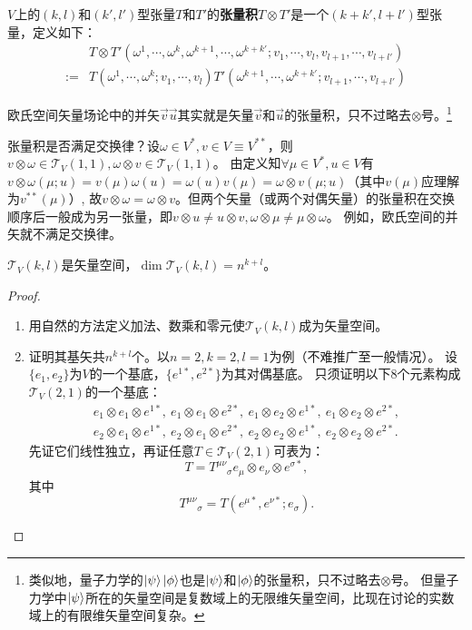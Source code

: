 \begin{definition}
$V$上的$(k, l)$和$(k', l')$型张量$T$和$T'$的\textbf{张量积}$T \otimes T'$是一个$(k + k', l + l')$型张量，定义如下：
$$\begin{aligned}
& T \otimes T'(\omega^1, \cdots, \omega^k, \omega^{k + 1}, \cdots, \omega^{k + k'}; v_1, \cdots, v_l, v_{l + 1}, \cdots, v_{l + l'}) \\
:= & T(\omega^1, \cdots, \omega^k; v_1, \cdots, v_l)T'(\omega^{k + 1}, \cdots, \omega^{k + k'}; v_{l + 1}, \cdots, v_{l + l'})
\end{aligned}$$
\end{definition}

欧氏空间矢量场论中的并矢$\vec{v}\vec{u}$其实就是矢量$\vec{v}$和$\vec{u}$的张量积，只不过略去$\otimes$号。\footnote{
类似地，量子力学的$\ket{\psi}\ket{\phi}$也是$\ket{\psi}$和$\ket{\phi}$的张量积，只不过略去$\otimes$号。
但量子力学中$\ket{\psi}$所在的矢量空间是复数域上的无限维矢量空间，比现在讨论的实数域上的有限维矢量空间复杂。
}

张量积是否满足交换律？设$\omega \in V^*, v \in V \equiv V^{**}$，则$v \otimes \omega \in \mathscr{T}_V(1, 1), \omega \otimes v \in \mathscr{T}_V(1, 1)$。
由定义知$\forall \mu \in V^*, u \in V$有$v \otimes \omega(\mu; u) = v(\mu)\omega(u) = \omega(u)v(\mu) = \omega \otimes v(\mu; u)$（其中$v(\mu)$应理解为$v^{**}(\mu)$）,
故$v \otimes \omega = \omega \otimes v$。但两个矢量（或两个对偶矢量）的张量积在交换顺序后一般成为另一张量，即$v \otimes u \neq u \otimes v, \omega \otimes \mu \neq \mu \otimes \omega$。
例如，欧氏空间的并矢就不满足交换律。

\begin{theorem}
$\mathscr{T}_V(k, l)$是矢量空间，$\dim\mathscr{T}_V(k, l) = n^{k + l}$。
\end{theorem}

\begin{proof}
\begin{enumerate}[（A）]
\item 用自然的方法定义加法、数乘和零元使$\mathscr{T}_V(k, l)$成为矢量空间。
\item 证明其基矢共$n^{k + l}$个。以$n = 2, k = 2, l = 1$为例（不难推广至一般情况）。
设$\{e_1, e_2\}$为$V$的一个基底，$\{e^{1*}, e^{2*}\}$为其对偶基底。
只须证明以下$8$个元素构成$\mathscr{T}_V(2, 1)$的一个基底：
$$\begin{aligned}
e_1 \otimes e_1 \otimes e^{1*}, ~ e_1 \otimes e_1 \otimes e^{2*}, ~ e_1 \otimes e_2 \otimes e^{1*}, ~ e_1 \otimes e_2 \otimes e^{2*}, \\
e_2 \otimes e_1 \otimes e^{1*}, ~ e_2 \otimes e_1 \otimes e^{2*}, ~ e_2 \otimes e_2 \otimes e^{1*}, ~ e_2 \otimes e_2 \otimes e^{2*}.
\end{aligned}$$
先证它们线性独立，再证任意$T \in \mathscr{T}_V(2, 1)$可表为：
$$T = T^{\mu\nu}{}_\sigma e_\mu \otimes e_\nu \otimes e^{\sigma*},$$
其中
$$T^{\mu\nu}{}_\sigma = T(e^{\mu*}, e^{\nu*}; e_\sigma).$$
\end{enumerate}
\end{proof}

